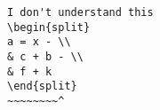 \begin{verbatim}
I don't understand this
\begin{split}
a = x - \\
& c + b - \\
& f + k
\end{split}
~~~~~~~~^
\end{verbatim}
